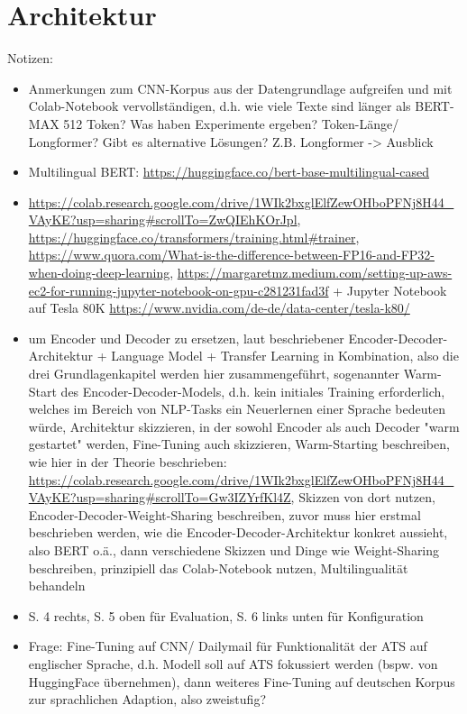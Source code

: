 \section{Architektur}
Notizen:
\begin{itemize}
	\item Anmerkungen zum CNN-Korpus aus der Datengrundlage aufgreifen und mit Colab-Notebook vervollständigen, d.h. wie viele Texte sind länger als BERT-MAX 512 Token? Was 	haben Experimente ergeben? Token-Länge/ Longformer? Gibt es alternative Lösungen? Z.B. Longformer -> Ausblick
	\item Multilingual BERT: \url{https://huggingface.co/bert-base-multilingual-cased}
	\item \url{https://colab.research.google.com/drive/1WIk2bxglElfZewOHboPFNj8H44_VAyKE?usp=sharing#scrollTo=ZwQIEhKOrJpl}, \url{https://huggingface.co/transformers/training.html#trainer}, \url{https://www.quora.com/What-is-the-difference-between-FP16-and-FP32-when-doing-deep-learning}, \url{https://margaretmz.medium.com/setting-up-aws-ec2-for-running-jupyter-notebook-on-gpu-c281231fad3f} + Jupyter Notebook auf Tesla 80K \url{https://www.nvidia.com/de-de/data-center/tesla-k80/}
	\item \cite{ROT20} um Encoder und Decoder zu ersetzen, laut beschriebener Encoder-Decoder-Architektur + Language Model + Transfer Learning in Kombination, also die drei Grundlagenkapitel werden hier zusammengeführt, sogenannter Warm-Start des Encoder-Decoder-Models, d.h. kein initiales Training erforderlich, welches im Bereich von NLP-Tasks ein Neuerlernen einer Sprache bedeuten würde, Architektur skizzieren, in der sowohl Encoder als auch Decoder "warm gestartet" werden, Fine-Tuning auch skizzieren, Warm-Starting beschreiben, wie hier in der Theorie beschrieben: \url{https://colab.research.google.com/drive/1WIk2bxglElfZewOHboPFNj8H44_VAyKE?usp=sharing#scrollTo=Gw3IZYrfKl4Z}, Skizzen von dort nutzen, Encoder-Decoder-Weight-Sharing beschreiben, zuvor muss hier erstmal beschrieben werden, wie die Encoder-Decoder-Architektur konkret aussieht, also BERT o.ä., dann verschiedene Skizzen und Dinge wie Weight-Sharing beschreiben, prinzipiell das Colab-Notebook nutzen, Multilingualität behandeln
	\item \cite{YAN19} S. 4 rechts, S. 5 oben für Evaluation, S. 6 links unten für Konfiguration
	\item Frage: Fine-Tuning auf CNN/ Dailymail für Funktionalität der ATS auf englischer Sprache, d.h. Modell soll auf ATS fokussiert werden (bspw. von HuggingFace übernehmen), dann weiteres Fine-Tuning auf deutschen Korpus zur sprachlichen Adaption, also zweistufig?

\end{itemize}
